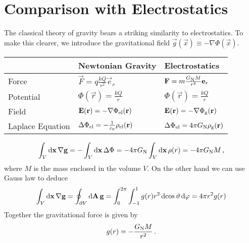 \section{Comparison with Electrostatics}
The classical theory of gravity bears a striking similarity to electrostatics. To make this clearer, we introduce the gravitational field $\vec{g}(\vec{x})\equiv -\nabla\Phi(\vec{x})$.
\begin{table}
\def\arraystretch{2} %
    \centering
    \begin{tabular}{lll}
        \toprule
        &Newtonian Gravity&Electrostatics\\
        \midrule
        Force&$\displaystyle\vec{F}=q\frac{kQ}{r^2}\vec{e}_r$&$\vec{F}=m\frac{G\textsubscript{N}M}{r^2}\vec{e}_r$\\
        Potential&$\Phi(\vec{r})=\frac{kQ}{r}$&$\Phi(\vec{r})=\frac{kQ}{r}$\\
        Field&$\vec{E}(\vec{r})=-\nabla\Phi\textsubscript{el}(\vec{r})$&$\vec{E}(\vec{r})=-\nabla\Phi\textsubscript{g}(\vec{r})$\\
        Laplace Equation
        &$\Delta\Phi\textsubscript{el}=-\frac{1}{\varepsilon_0}\rho\textsubscript{el}(\vec{r})$&
        $\Delta\Phi\textsubscript{el}=4\pi
        G\textsubscript{N}\rho\textsubscript{g}(\vec{r})$
        \\
        \bottomrule
    \end{tabular}
    \def\arraystretch{1}
\end{table}
\begin{example}
\begin{equation}
    \int_V\dif{\vec{x}}\, \nabla\vec{g}=-\int_V\dif{\vec{x}}\, \Delta\Phi = -4\pi G\textsubscript{N}\int_V\dif{\vec{x}}\,\rho(r)= -4\pi G\textsubscript{N} M\, ,
\end{equation}
where $M$ is the mass enclosed in the volume $V$. On the other hand we can use Gauss law to deduce
\begin{equation}
    \int_V\dif{\vec{x}}\, \nabla\vec{g}=\oint_{\partial V}\dif{\vec{A}}\, \vec{g} =\int_{0}^{2\pi}\int_{-1}^{1} g(r)r^2\dif{\cos\vartheta}\dif{\varphi}=4\pi r^2g(r)
\end{equation}
Together the gravitational force is given by
\begin{equation}
    g(r)=-\frac{G\textsubscript{N}M}{r^2}\, .
\end{equation}
\end{example}
